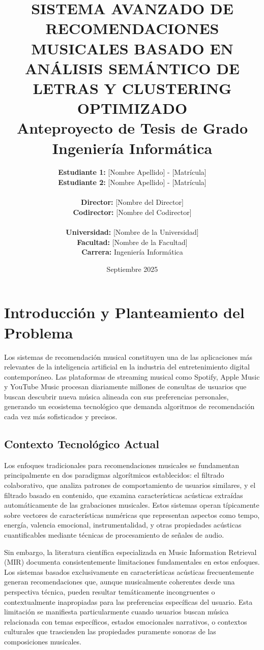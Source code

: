 \documentclass[12pt,a4paper]{article}
\title{\textbf{SISTEMA AVANZADO DE RECOMENDACIONES MUSICALES BASADO EN ANÁLISIS SEMÁNTICO DE LETRAS Y CLUSTERING OPTIMIZADO}\\
\vspace{0.5cm}
\large{Anteproyecto de Tesis de Grado}\\
\large{Ingeniería Informática}}
\author{
\textbf{Estudiante 1:} [Nombre Apellido] - [Matrícula] \\
\textbf{Estudiante 2:} [Nombre Apellido] - [Matrícula] \\
\\
\textbf{Director:} [Nombre del Director] \\
\textbf{Codirector:} [Nombre del Codirector] \\
\\
\textbf{Universidad:} [Nombre de la Universidad] \\
\textbf{Facultad:} [Nombre de la Facultad] \\
\textbf{Carrera:} Ingeniería Informática
}
\date{Septiembre 2025}
\begin{document}
\maketitle
\thispagestyle{empty}

\newpage
\tableofcontents
\newpage

\section{Introducción y Planteamiento del Problema}

Los sistemas de recomendación musical constituyen una de las aplicaciones más relevantes de la inteligencia artificial en la industria del entretenimiento digital contemporáneo. Las plataformas de streaming musical como Spotify, Apple Music y YouTube Music procesan diariamente millones de consultas de usuarios que buscan descubrir nueva música alineada con sus preferencias personales, generando un ecosistema tecnológico que demanda algoritmos de recomendación cada vez más sofisticados y precisos.

\subsection{Contexto Tecnológico Actual}

Los enfoques tradicionales para recomendaciones musicales se fundamentan principalmente en dos paradigmas algorítmicos establecidos: el filtrado colaborativo, que analiza patrones de comportamiento de usuarios similares, y el filtrado basado en contenido, que examina características acústicas extraídas automáticamente de las grabaciones musicales. Estos sistemas operan típicamente sobre vectores de características numéricas que representan aspectos como tempo, energía, valencia emocional, instrumentalidad, y otras propiedades acústicas cuantificables mediante técnicas de procesamiento de señales de audio.

Sin embargo, la literatura científica especializada en Music Information Retrieval (MIR) documenta consistentemente limitaciones fundamentales en estos enfoques. Los sistemas basados exclusivamente en características acústicas frecuentemente generan recomendaciones que, aunque musicalmente coherentes desde una perspectiva técnica, pueden resultar temáticamente incongruentes o contextualmente inapropiadas para las preferencias específicas del usuario. Esta limitación se manifiesta particularmente cuando usuarios buscan música relacionada con temas específicos, estados emocionales narrativos, o contextos culturales que trascienden las propiedades puramente sonoras de las composiciones musicales.
\end{document}
